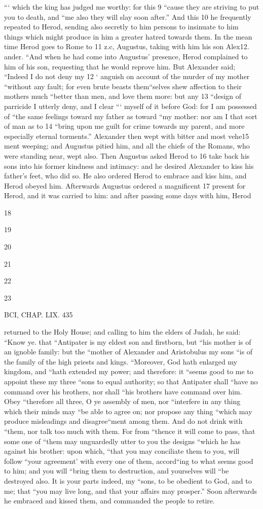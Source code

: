 “‘ which the king has judged me worthy: for this 9 “cause they are striving to put you to death, and “me also they will slay soon after.” And this 10 he frequently repeated to Herod, sending also secretly to him persons to insinuate to him things which might produce in him a greater hatred towards them. In the mean time Herod goes to Rome to 11 z.c, Augustus, taking with him his son Alex12. ander. “And when he had come into Augustus’ presence, Herod complained to him of his son, requesting that he would reprove him. But Alexander said; “Indeed I do not deny my 12 ‘ anguish on account of the murder of my mother “without any fault; for even brute beasts them“selves shew affection to their mothers much “better than men, and love them more: but any 13 “design of parricide I utterly deny, and I clear “‘ myself of it before God: for I am possessed of “the same feelings toward my father as toward “my mother: nor am I that sort of man as to 14 “bring upon me guilt for crime towards my parent, and more especially eternal torments.” Alexander then wept with bitter and most vehe15 ment weeping; and Augustus pitied him, and all the chiefs of the Romans, who were standing near, wept also. Then Augustus asked Herod to 16 take back his sons into his former kindness and intimacy: and he desired Alexander to kiss his father’s feet, who did so. He also ordered Herod to embrace and kiss him, and Herod obeyed him. Afterwards Augustus ordered a magnificent 17 present for Herod, and it was carried to him: and after passing some days with him, Herod 

18 

19 

20 

21 

22 

23 

BCI, CHAP. LIX. 435 

returned to the Holy House; and calling to him the elders of Judah, he said: “Know ye. that “Antipater is my eldest son and firstborn, but “his mother is of an ignoble family: but the “mother of Alexander and Aristobulus my sons “is of the family of the high priests and kings. “Moreover, God hath enlarged my kingdom, and “hath extended my power; and therefore: it “seems good to me to appoint these my three “sons to equal authority; so that Antipater shall “have no command over his brothers, nor shall “his brothers have command over him. Obey “therefore all three, O ye assembly of men, nor “interfere in any thing which their minds may “be able to agree on; nor propose any thing “which may produce misleadings and disagree“ment among them. And do not drink with “them, nor talk too much with them. For from “thence it will come to pass, that some one of “them may unguardedly utter to you the designs “which he has against his brother: upon which, “that you may conciliate them to you, will follow “your agreement’ with every one of them, accord“ing to what seems good to him; and you will “bring them to destruction, and yourselves will “be destroyed also. It is your parts indeed, my “sons, to be obedient to God, and to me; that “you may live long, and that your affairs may prosper.” Soon afterwards he embraced and kissed them, and commanded the people to retire. 

